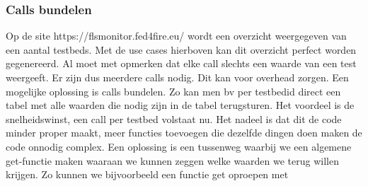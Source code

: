\documentclass[11pt]{article}
\begin{document}
\subsubsection{Calls bundelen}
Op de site https://flsmonitor.fed4fire.eu/ wordt een overzicht weergegeven van een aantal testbeds.
Met de use cases hierboven kan dit overzicht perfect worden gegenereerd. Al moet met opmerken dat elke call slechts een waarde van een test weergeeft. Er zijn dus meerdere calls nodig.
Dit kan voor overhead zorgen. Een mogelijke oplossing is calls bundelen. 
Zo kan men bv per testbedid direct een tabel met alle waarden die nodig zijn in de tabel terugsturen.
Het voordeel is de snelheidswinst, een call per testbed volstaat nu.
Het nadeel is dat dit de code minder proper maakt, 
meer functies toevoegen die dezelfde dingen doen maken de code onnodig complex.
Een oplossing is een tussenweg waarbij we een algemene get-functie maken waaraan we kunnen zeggen welke waarden we terug willen krijgen. 
Zo kunnen we bijvoorbeeld een functie get oproepen met \\
\end{document}
